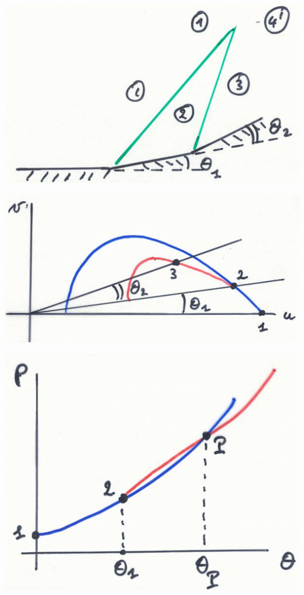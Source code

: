 	\begin{center}
\begin{minipage}{0.33\textwidth}
\includegraphics[scale=0.1]{ch9/15}
\end{minipage}
\begin{minipage}{0.4\textwidth}
\includegraphics[scale=0.1]{ch9/16}
\end{minipage}
\begin{minipage}{0.25\textwidth}
\includegraphics[scale=0.1]{ch9/17}
\end{minipage}
\end{center}


